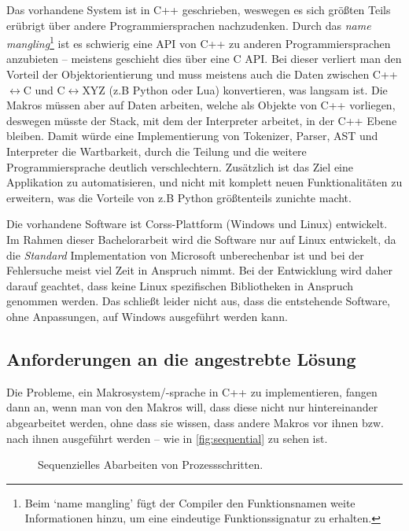     Das vorhandene System ist in C++ geschrieben, weswegen es sich größten Teils erübrigt über andere Programmiersprachen nachzudenken. Durch das \emph{name mangling}\footnote{
      Beim `name mangling' fügt der Compiler den Funktionsnamen weite Informationen hinzu, um eine eindeutige Funktionssignatur zu erhalten.
    } ist es schwierig eine API von C++ zu anderen Programmiersprachen anzubieten -- meistens geschieht dies über eine C API. Bei dieser verliert man den Vorteil der Objektorientierung und muss meistens auch die Daten zwischen C++$\longleftrightarrow$C und C$\longleftrightarrow$XYZ (z.B Python oder Lua) konvertieren, was langsam ist. Die Makros müssen aber auf Daten arbeiten, welche als Objekte von C++ vorliegen, deswegen müsste der Stack, mit dem der Interpreter arbeitet, in der C++ Ebene bleiben. Damit würde eine Implementierung von Tokenizer, Parser, AST und Interpreter die Wartbarkeit, durch die Teilung und die weitere Programmiersprache deutlich verschlechtern. Zusätzlich ist das Ziel eine Applikation zu automatisieren, und nicht mit komplett neuen Funktionalitäten zu erweitern, was die Vorteile von z.B Python größtenteils zunichte macht.

    Die vorhandene Software ist Corss-Plattform (Windows und Linux) entwickelt. Im Rahmen dieser Bachelorarbeit wird die Software nur auf Linux entwickelt, da die \emph{Standard} Implementation von Microsoft unberechenbar ist und bei der Fehlersuche meist viel Zeit in Anspruch nimmt. Bei der Entwicklung wird daher darauf geachtet, dass keine Linux spezifischen Bibliotheken in Anspruch genommen werden. Das schließt leider nicht aus, dass die entstehende Software, ohne Anpassungen, auf Windows ausgeführt werden kann.

  \subsection{Anforderungen an die angestrebte Lösung}
  \label{ssec:Anforderungen an die angestrebte Lösung}
    Die Probleme, ein Makrosystem/-sprache in C++ zu implementieren, fangen dann an, wenn man von den Makros will, dass diese nicht nur hintereinander abgearbeitet werden, ohne dass sie wissen, dass andere Makros vor ihnen bzw. nach ihnen ausgeführt werden -- wie in \autoref{fig:sequential} zu sehen ist.

    \begin{figure}[H]
      \centering
      \caption{Sequenzielles Abarbeiten von Prozessschritten.}
      \label{fig:sequential}
    \end{figure}

